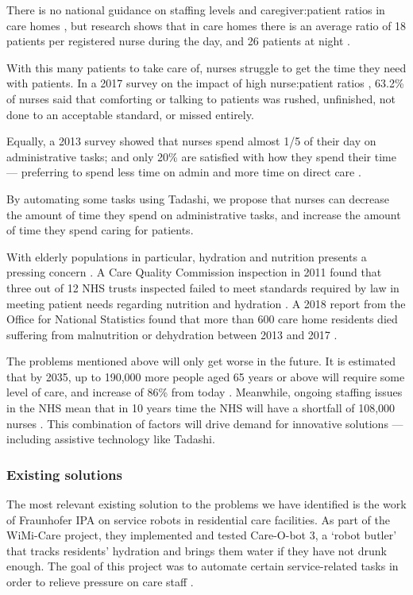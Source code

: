 \documentclass{article}
\begin{document}
There is no national guidance on staffing levels and caregiver:patient ratios in care homes \cite{rcnstaffingadvice}, but research shows that in care homes there is an average ratio of 18 patients per registered nurse during the day, and 26 patients at night \cite{rcnstaffingguidance}.

With this many patients to take care of, nurses struggle to get the time they need with patients. In a 2017 survey on the impact of high nurse:patient ratios \cite{unison}, 63.2\% of nurses said that comforting or talking to patients was rushed, unfinished, not done to an acceptable standard, or missed entirely.

Equally, a 2013 survey showed that nurses spend almost 1/5 of their day on administrative tasks; and only 20\% are satisfied with how they spend their time --- preferring to spend less time on admin and more time on direct care \cite{rcnpol}.

By automating some tasks using Tadashi, we propose that nurses can decrease the amount of time they spend on administrative tasks, and increase the amount of time they spend caring for patients. 

With elderly populations in particular, hydration and nutrition presents a pressing concern \cite{hydrate}. A Care Quality Commission inspection in 2011 found that three out of 12 NHS trusts inspected failed to meet standards required by law in meeting patient needs regarding nutrition and hydration \cite{cqc}. A 2018 report from the Office for National Statistics found that more than 600 care home residents died suffering from malnutrition or dehydration between 2013 and 2017 \cite{ons}.

The problems mentioned above will only get worse in the future. It is estimated that by 2035, up to 190,000 more people aged 65 years or above will require some level of care, and increase of 86\% from today \cite{lancet}. Meanwhile, ongoing staffing issues in the NHS mean that in 10 years time the NHS will have a shortfall of 108,000 nurses \cite{nuffield}. This combination of factors will drive demand for innovative solutions --- including assistive technology like Tadashi.


\subsubsection{Existing solutions}
The most relevant existing solution to the problems we have identified is the work of Fraunhofer IPA on service robots in residential care facilities. As part of the WiMi-Care project, they implemented and tested Care-O-bot 3, a `robot butler' that tracks residents' hydration and brings them water if they have not drunk enough. The goal of this project was to automate certain service-related tasks in order to relieve pressure on care staff \cite{fraunhofer}.
\end{document}
